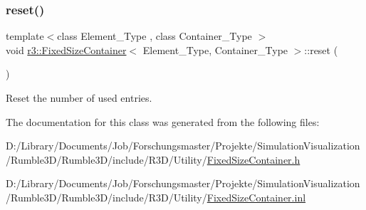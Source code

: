 \subsubsection{\texorpdfstring{reset()}{reset()}}
{\footnotesize\ttfamily template$<$class Element\+\_\+\+Type , class Container\+\_\+\+Type $>$ \\
void \mbox{\hyperlink{classr3_1_1_fixed_size_container}{r3\+::\+Fixed\+Size\+Container}}$<$ Element\+\_\+\+Type, Container\+\_\+\+Type $>$\+::reset (\begin{DoxyParamCaption}{ }\end{DoxyParamCaption})}



Reset the number of used entries. 



The documentation for this class was generated from the following files\+:\begin{DoxyCompactItemize}
\item 
D\+:/\+Library/\+Documents/\+Job/\+Forschungsmaster/\+Projekte/\+Simulation\+Visualization/\+Rumble3\+D/\+Rumble3\+D/include/\+R3\+D/\+Utility/\mbox{\hyperlink{_fixed_size_container_8h}{Fixed\+Size\+Container.\+h}}\item 
D\+:/\+Library/\+Documents/\+Job/\+Forschungsmaster/\+Projekte/\+Simulation\+Visualization/\+Rumble3\+D/\+Rumble3\+D/include/\+R3\+D/\+Utility/\mbox{\hyperlink{_fixed_size_container_8inl}{Fixed\+Size\+Container.\+inl}}\end{DoxyCompactItemize}
